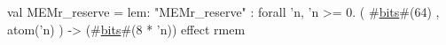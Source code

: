 val MEMr_reserve = {lem: "MEMr_reserve"} : forall 'n, 'n >= 0.
  ( #\hyperref[zbits]{bits}#(64) , atom('n) ) -> (#\hyperref[zbits]{bits}#(8 * 'n)) effect { rmem }
